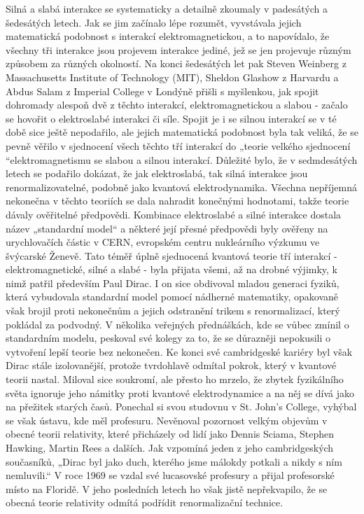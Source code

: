   Silná a slabá interakce se systematicky a detailně zkoumaly v padesátých a šedesátých letech. Jak
  se jim začínalo lépe rozumět, vyvstávala jejich matematická podobnost s interakcí
  elektromagnetickou, a to napovídalo, že všechny tři interakce jsou projevem interakce jediné, jež
  se jen projevuje různým způsobem za různých okolností. Na konci šedesátých let pak Steven Weinberg
  z Massachusetts Institute of Technology (MIT), Sheldon Glashow z Harvardu a Abdus Salam z Imperial
  College v Londýně přišli s myšlenkou, jak spojit dohromady alespoň dvě z těchto interakcí,
  elektromagnetickou a slabou - začalo se hovořit o elektroslabé interakci či síle. Spojit je i se
  silnou interakcí se v té době sice ještě nepodařilo, ale jejich matematická podobnost byla tak
  veliká, že se pevně věřilo v sjednocení všech těchto tří interakcí do „teorie velkého sjednocení
  “elektromagnetismu se slabou a silnou interakcí. Důležité bylo, že v sedmdesátých letech se
  podařilo dokázat, že jak elektroslabá, tak silná interakce jsou renormalizovatelné, podobně jako
  kvantová elektrodynamika. Všechna nepříjemná nekonečna v těchto teoriích se dala nahradit
  konečnými hodnotami, takže teorie dávaly ověřitelné předpovědi. Kombinace elektroslabé a silné
  interakce dostala název „standardní model“ a některé její přesné předpovědi byly ověřeny na
  urychlovačích částic v CERN, evropském centru nukleárního výzkumu ve švýcarské Ženevě. Tato téměř
  úplně sjednocená kvantová teorie tří interakcí - elektromagnetické, silné a slabé - byla přijata
  všemi, až na drobné výjimky, k nimž patřil především Paul Dirac. I on sice obdivoval mladou
  generaci fyziků, která vybudovala standardní model pomocí nádherné matematiky, opakovaně však
  brojil proti nekonečnům a jejich odstranění trikem s renormalizací, který pokládal za podvodný. V
  několika veřejných přednáškách, kde se vůbec zmínil o standardním modelu, peskoval své kolegy za
  to, že se důrazněji nepokusili o vytvoření lepší teorie bez nekonečen. Ke konci své cambridgeské
  kariéry byl však Dirac stále izolovanější, protože tvrdohlavě odmítal pokrok, který v kvantové
  teorii nastal. Miloval sice soukromí, ale přesto ho mrzelo, že zbytek fyzikálního světa ignoruje
  jeho námitky proti kvantové elektrodynamice a na něj se dívá jako na přežitek starých časů.
  Ponechal si svou studovnu v St. John’s College, vyhýbal se však ústavu, kde měl profesuru.
  Nevěnoval pozornost velkým objevům v obecné teorii relativity, které přicházely od lidí jako
  Dennis Sciama, Stephen Hawking, Martin Rees a dalších. Jak vzpomíná jeden z jeho cambridgeských
  současníků, „Dirac byl jako duch, kterého jsme málokdy potkali a nikdy s ním nemluvili.“ V roce
  1969 se vzdal své lucasovské profesury a přijal profesorské místo na Floridě. V jeho posledních
  letech ho však jistě nepřekvapilo, že se obecná teorie relativity odmítá podřídit renormalizační
  technice. 
  
